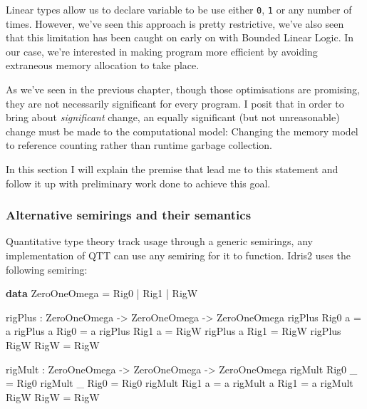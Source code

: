 \documentclass[
]{article}
\newenvironment{Shaded}{}{}
\newcommand{\DataTypeTok}[1]{\textcolor[rgb]{0.56,0.13,0.00}{#1}}
\newcommand{\KeywordTok}[1]{\textcolor[rgb]{0.00,0.44,0.13}{\textbf{#1}}}
\newcommand{\NormalTok}[1]{#1}
\newcommand{\OperatorTok}[1]{\textcolor[rgb]{0.40,0.40,0.40}{#1}}
\newcommand{\OtherTok}[1]{\textcolor[rgb]{0.00,0.44,0.13}{#1}}
\begin{document}
Linear types allow us to declare variable to be use either \texttt{0},
\texttt{1} or any number of times. However, we've seen this approach is
pretty restrictive, we've also seen that this limitation has been caught
on early on with Bounded Linear Logic. In our case, we're interested in
making program more efficient by avoiding extraneous memory allocation
to take place.

As we've seen in the previous chapter, though those optimisations are
promising, they are not necessarily significant for every program. I
posit that in order to bring about \emph{significant} change, an equally
significant (but not unreasonable) change must be made to the
computational model: Changing the memory model to reference counting
rather than runtime garbage collection.

In this section I will explain the premise that lead me to this
statement and follow it up with preliminary work done to achieve this
goal.

\hypertarget{alternative-semirings-and-their-semantics}{%
\subsubsection{Alternative semirings and their
semantics}\label{alternative-semirings-and-their-semantics}}

Quantitative type theory track usage through a generic semirings, any
implementation of QTT can use any semiring for it to function. Idris2
uses the following semiring:

\begin{Shaded}
\begin{Highlighting}[]
\KeywordTok{data} \DataTypeTok{ZeroOneOmega} \OtherTok{=} \DataTypeTok{Rig0} \OperatorTok{|} \DataTypeTok{Rig1} \OperatorTok{|} \DataTypeTok{RigW}

\NormalTok{rigPlus }\OperatorTok{:} \DataTypeTok{ZeroOneOmega} \OtherTok{{-}\textgreater{}} \DataTypeTok{ZeroOneOmega} \OtherTok{{-}\textgreater{}} \DataTypeTok{ZeroOneOmega}
\NormalTok{rigPlus }\DataTypeTok{Rig0}\NormalTok{ a }\OtherTok{=}\NormalTok{ a}
\NormalTok{rigPlus a }\DataTypeTok{Rig0} \OtherTok{=}\NormalTok{ a}
\NormalTok{rigPlus }\DataTypeTok{Rig1}\NormalTok{ a }\OtherTok{=} \DataTypeTok{RigW}
\NormalTok{rigPlus a }\DataTypeTok{Rig1} \OtherTok{=} \DataTypeTok{RigW}
\NormalTok{rigPlus }\DataTypeTok{RigW} \DataTypeTok{RigW} \OtherTok{=} \DataTypeTok{RigW}

\NormalTok{rigMult }\OperatorTok{:} \DataTypeTok{ZeroOneOmega} \OtherTok{{-}\textgreater{}} \DataTypeTok{ZeroOneOmega} \OtherTok{{-}\textgreater{}} \DataTypeTok{ZeroOneOmega}
\NormalTok{rigMult }\DataTypeTok{Rig0}\NormalTok{ \_ }\OtherTok{=} \DataTypeTok{Rig0}
\NormalTok{rigMult \_ }\DataTypeTok{Rig0} \OtherTok{=} \DataTypeTok{Rig0}
\NormalTok{rigMult }\DataTypeTok{Rig1}\NormalTok{ a }\OtherTok{=}\NormalTok{ a}
\NormalTok{rigMult a }\DataTypeTok{Rig1} \OtherTok{=}\NormalTok{ a}
\NormalTok{rigMult }\DataTypeTok{RigW} \DataTypeTok{RigW} \OtherTok{=} \DataTypeTok{RigW}
\end{Highlighting}
\end{Shaded}
\end{document}
